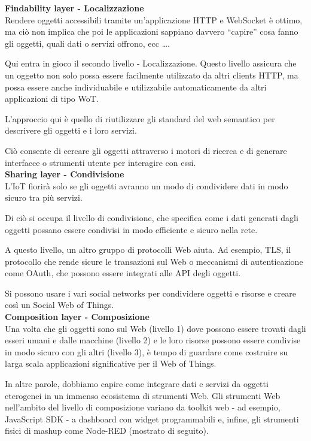\textbf{Findability layer - Localizzazione}\\

Rendere oggetti accessibili tramite un'applicazione HTTP e WebSocket è ottimo,
ma ciò non implica che poi le applicazioni sappiano davvero ``capire''
cosa fanno gli oggetti, quali dati o servizi offrono, ecc \dots.

Qui entra in gioco il secondo livello - Localizzazione.
Questo livello assicura che un oggetto non solo possa essere facilmente
utilizzato da altri clients HTTP, ma possa essere anche individuabile e
utilizzabile automaticamente da altri applicazioni di tipo WoT.

L'approccio qui è quello di riutilizzare gli standard del web semantico per
descrivere gli oggetti e i loro servizi.

Ciò consente di cercare gli oggetti attraverso i motori di ricerca e di
generare interfacce o strumenti utente per interagire con essi. \\

\textbf{Sharing layer - Condivisione}\\

L'IoT fiorirà solo se gli oggetti avranno un modo di
condividere dati in modo sicuro tra più servizi.

Di ciò si occupa il livello di condivisione, che specifica come i dati
generati dagli oggetti possano essere condivisi in modo efficiente e sicuro
nella rete.

A questo livello, un altro gruppo di protocolli Web aiuta.
Ad esempio, TLS, il protocollo che rende sicure le transazioni sul Web o
meccanismi di autenticazione come OAuth, che possono essere integrati
alle API degli oggetti.

Si possono usare i vari social networks per condividere oggetti e risorse
e creare così un Social Web of Things.\\

\textbf{Composition layer - Composizione}\\

Una volta che gli oggetti sono sul Web (livello 1) dove possono
essere trovati dagli esseri umani e dalle macchine (livello 2) e le loro
risorse possono essere condivise in modo sicuro con gli altri (livello 3),
è tempo di guardare come costruire su larga scala applicazioni significative
per il Web of Things.

In altre parole, dobbiamo capire come integrare dati e servizi da oggetti
eterogenei in un immenso ecosistema di strumenti Web.
Gli strumenti Web nell'ambito del livello di composizione variano da toolkit
web - ad esempio, JavaScript SDK - a dashboard con widget programmabili e,
infine, gli strumenti fisici di mashup come Node-RED (mostrato di seguito).

